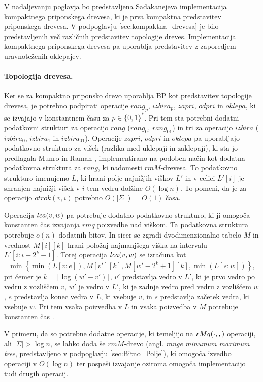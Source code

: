 V nadaljevanju poglavja bo predstavljena Sadakanejeva \cite{Sadakane2007} implementacija kompaktnega priponskega drevesa, ki je prva kompaktna predstavitev priponskega drevesa. V podpoglavju \ref{sec:kompaktna_drevesa} je bilo predstavljenih več različnih predstavitev topologije dreves. Implementacija kompaktnega priponskega drevesa pa uporablja predstavitev z zaporedjem uravnoteženih oklepajev.

\paragraph{Topologija drevesa.}
Ker se za kompaktno priponsko drevo uporablja BP kot predstavitev topologije drevesa, je potrebno podpirati operacije $rang_p$, $izbira_p$, $zapri$, $odpri$ in $oklepa$, ki se izvajajo v konstantnem času za $p\in\{0,1\} ^*$. Pri tem sta potrebni dodatni podatkovni strukturi za operacijo $rang$ ($rang_0$, $rang_{01}$) in tri za operacijo $izbira$ ($izbira_0$, $izbira_1$ in $izbira_{01}$). Operacije $zapri$, $odpri$ in $oklepa$ pa uporabljajo podatkovno strukturo za višek (razlika med uklepaji in zaklepaji), ki sta jo predlagala Munro in Raman \cite{Munro1997}, implementirano na podoben način kot dodatna podatkovna struktura za $rang$, ki nadomesti $rmM$-drevesa. To podatkovno strukturo imenujemo $L$, ki hrani polje najnižjih viškov $L'$ in v celici $L'[i]$ je shranjen najnižji višek v $i$-tem vedru dolžine $O(\log{n})$. To pomeni, da je za operacijo $otrok(v,i)$ potrebno $O(|\Sigma|)=O(1)$ časa. 

Operacija $ \mathop{lca}(v,w) $ pa potrebuje dodatno podatkovno strukturo, ki ji omogoča konstanten čas izvajanja $rmq$ poizvedbe nad viškom. Ta podatkovna struktura potrebuje $o(n)$ dodatnih bitov. In sicer se zgradi dvodimenzionalno tabelo $M$ in vrednost $M[i][k]$ hrani položaj najmanjšega viška na intervalu $L'[i:i+2^k-1]$. Torej operacija $ \mathop{lca}(v,w) $ se izračuna kot
\begin{equation*}
    \min\left\{\min(L[v:e]),M[v'][k],M[w'-2^k+1][k],\min(L[s:w])\right\},
\end{equation*}
pri čemer je $k=\lfloor \log{(w'-v')\rfloor}$, $v'$ predstavlja vedro v $L'$, ki je prvo vedro po vedru z vozliščem $v$, $w'$ je vedro v $L'$, ki je zadnje vedro pred vedru z vozliščem $w$, $e$ predstavlja konec vedra v $L$, ki vsebuje $v$, in $s$ predstavlja začetek vedra, ki vsebuje $w$. Pri tem vsaka poizvedba v $L$ in vsaka poizvedba v $M$ potrebuje konstanten čas \cite{Sadakane2007,Valimaki2007}. 

V primeru, da so potrebne dodatne operacije, ki temeljijo na $ \mathop{rMq}(\cdot,,) $ operaciji, ali $|\Sigma|>\log{n}$, se lahko doda še $rmM$-drevo (angl. \textit{range minumum maximum tree}, predstavljeno v podpoglavju \ref{sec:Bitno_Polje}), ki omogoča izvedbo operaciji v $O(\log{n})$ ter pospeši izvajanje oziroma omogoča implementacijo tudi drugih operacij.


